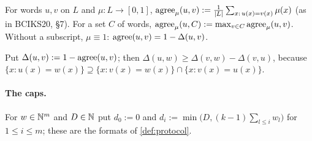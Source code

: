 \begin{definition}\label{def:agree}
For words $u,v$ on $L$ and $\mu:L\to[0,1]$,
$\mathrm{agree}_\mu(u,v):=\frac1{|L|}\sum_{x:\,u(x)=v(x)}\mu(x)$ (as in BCIKS20, \S7). For a set
$C$ of words, $\mathrm{agree}_\mu(u,C):=\max_{v\in C}\mathrm{agree}_\mu(u,v)$. Without a subscript,
$\mu\equiv1$: $\mathrm{agree}(u,v)=1-\Delta(u,v)$.
\end{definition}

Put $\Delta(u,v):=1-\mathrm{agree}(u,v)$; then $\Delta(u,w)\ge\Delta(v,w)-\Delta(v,u)$, because
$\{x:u(x)=w(x)\}\supseteq\{x:v(x)=w(x)\}\cap\{x:v(x)=u(x)\}$.

\paragraph{The caps.} For $w\in\mathbb{N}^m$ and $D\in\mathbb{N}$ put $d_0:=0$ and
$d_i:=\min\big(D,(k-1)\sum_{l\le i}w_l\big)$ for $1\le i\le m$; these are the formats of
\cref{def:protocol}.
